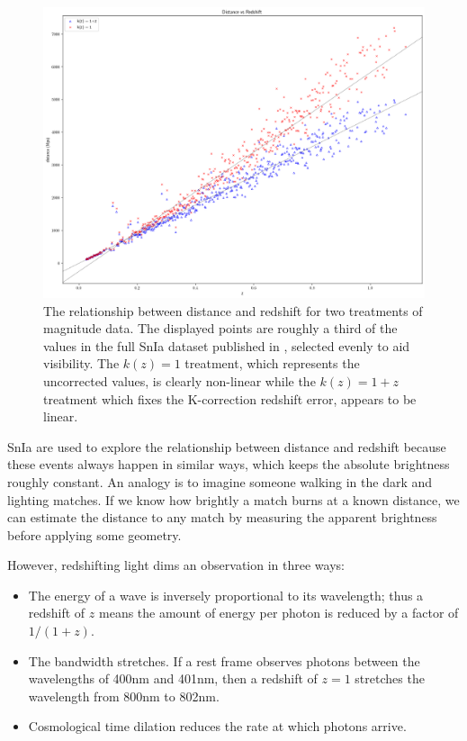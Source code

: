 \documentclass[linenumbers]{aastex631}
\begin{document}
\begin{figure}
  \includegraphics[width=\linewidth]{mu_distance_vs_redshift.png}
  \caption{The relationship between distance and redshift for two treatments of
  magnitude data. The displayed points are roughly a third of the values in the
  full SnIa dataset published in \citet{abbott2024}, selected evenly to aid
  visibility. The $k(z) = 1$ treatment, which represents the uncorrected
  values, is clearly non-linear while the $k(z) = 1 + z$ treatment which fixes
  the K-correction redshift error, appears to be linear.}
  \label{fig:mu_distance_vs_redshift}
\end{figure}

SnIa are used to explore the relationship between distance and redshift because
these events always happen in similar ways, which keeps the absolute brightness
roughly constant. An analogy is to imagine someone walking in the dark and
lighting matches. If we know how brightly a match burns at a known distance, we
can estimate the distance to any match by measuring the apparent brightness
before applying some geometry.

However, redshifting light dims an observation in three ways:

\begin{itemize}
  \item The energy of a wave is inversely proportional to its wavelength; thus a
  redshift of $z$ means the amount of energy per photon is reduced by a factor
  of $1 / (1+z)$.

  \item The bandwidth stretches. If a rest frame observes photons
  between the wavelengths of 400nm and 401nm, then a redshift of $z = 1$
  stretches the wavelength from 800nm to 802nm.

  \item Cosmological time dilation reduces the rate at which photons arrive.
\end{itemize}
\end{document}
